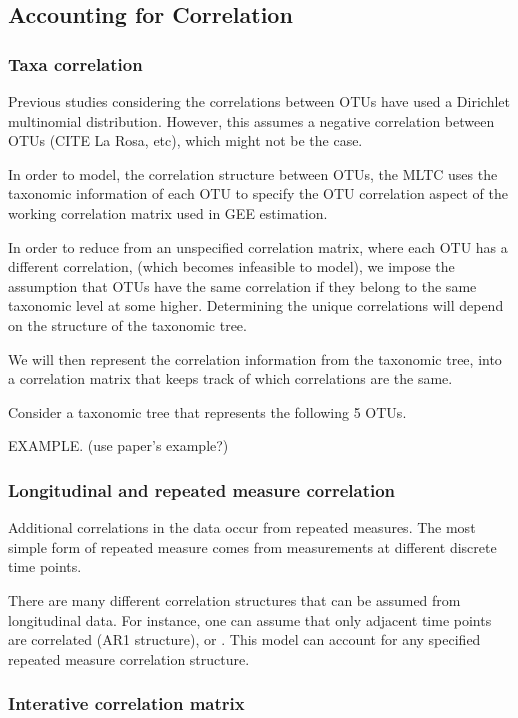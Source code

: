 \documentclass[12pt]{article}
\begin{document}
\subsection{Accounting for Correlation}
\subsubsection{Taxa correlation}

Previous studies considering the correlations between OTUs have used a Dirichlet multinomial distribution. However, this assumes a negative correlation between OTUs (CITE La Rosa, etc), which might not be the case.

In order to model, the correlation structure between OTUs, the MLTC uses the taxonomic information of each OTU to specify the OTU correlation aspect of the working correlation matrix used in GEE estimation.


In order to reduce from an unspecified correlation matrix, where each OTU has a different correlation, (which becomes infeasible to model), we impose the assumption that OTUs have the same correlation if they belong to the same taxonomic level at some higher. Determining the unique correlations will depend on the structure of the taxonomic tree.

We will then represent the correlation information from the taxonomic tree, into a correlation matrix that keeps track of which correlations are the same.

Consider a taxonomic tree that represents the following 5 OTUs.


EXAMPLE. (use paper's example?)


\subsubsection{Longitudinal and repeated measure correlation}

Additional correlations in the data occur from repeated measures. The most simple form of repeated measure comes from measurements at different discrete time points.

There are many different correlation structures that can be assumed from longitudinal data. For instance, one can assume that only adjacent time points are correlated (AR1 structure), or . This model can account for any specified repeated measure correlation structure.

\subsubsection{Interative correlation matrix }
\end{document}
